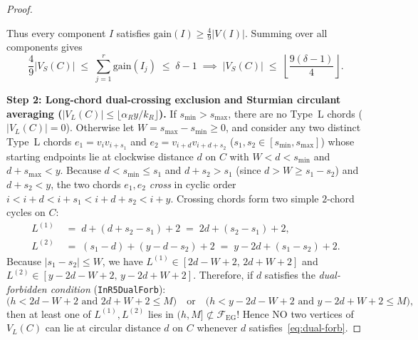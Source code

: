 \documentclass[11pt,reqno]{amsart}
\theoremstyle{plain}
\theoremstyle{definition}
\theoremstyle{remark}
\newcommand{\FEG}{\mathcal{F}_{\mathrm{EG}}}
\DeclareRobustCommand{\_}{\ifmmode\text{\textunderscore}\else\textunderscore\allowbreak\fi}
\begin{document}
\begin{proof}
\begin{itemize}[leftmargin=1.6em]
\end{itemize}
Thus every component $I$ satisfies $\mathrm{gain}(I) \ge \frac{4}{9}|V(I)|$. Summing over all components gives
\[
  \frac{4}{9}|V_S(C)| \;\le\; \sum_{j=1}^r \mathrm{gain}(I_j) \;\le\; \delta - 1 \;\implies\; |V_S(C)| \;\le\; \left\lfloor \frac{9(\delta - 1)}{4} \right\rfloor.
\]

\medskip
\noindent\textbf{Step 2: Long-chord dual-crossing exclusion and Sturmian circulant averaging ($|V_L(C)| \le \lfloor \alpha_R y / k_R \rfloor$).}
If $s_{\min} > s_{\max}$, there are no Type~L chords ($|V_L(C)| = 0$). Otherwise let $W = s_{\max} - s_{\min} \ge 0$, and consider any two distinct Type~L chords $e_1 = v_i v_{i + s_1}$ and $e_2 = v_{i + d} v_{i + d + s_2}$ ($s_1, s_2 \in [s_{\min}, s_{\max}]$) whose starting endpoints lie at clockwise distance $d$ on $C$ with $W < d < s_{\min}$ and $d + s_{\max} < y$. Because $d < s_{\min} \le s_1$ and $d + s_2 > s_1$ (since $d > W \ge s_1 - s_2$) and $d + s_2 < y$, the two chords $e_1, e_2$ \emph{cross} in cyclic order $i < i + d < i + s_1 < i + d + s_2 < i + y$. Crossing chords form two simple $2$-chord cycles on $C$:
\begin{align*}
  L^{(1)} &\;=\; d + (d + s_2 - s_1) + 2 \;=\; 2d + (s_2 - s_1) + 2,\\
  L^{(2)} &\;=\; (s_1 - d) + (y - d - s_2) + 2 \;=\; y - 2d + (s_1 - s_2) + 2.
\end{align*}
Because $|s_1 - s_2| \le W$, we have $L^{(1)} \in [2d - W + 2,\, 2d + W + 2]$ and $L^{(2)} \in [y - 2d - W + 2,\, y - 2d + W + 2]$. Therefore, if $d$ satisfies the \emph{dual-forbidden condition} (\texttt{InR5DualForb}):
\begin{equation}\label{eq:dual-forb}
  \bigl(h < 2d - W + 2 \text{ and } 2d + W + 2 \le M\bigr) \quad\text{or}\quad
  \bigl(h < y - 2d - W + 2 \text{ and } y - 2d + W + 2 \le M\bigr),
\end{equation}
then at least one of $L^{(1)}, L^{(2)}$ lies in $(h, M] \not\subset \FEG$! Hence NO two vertices of $V_L(C)$ can lie at circular distance $d$ on $C$ whenever $d$ satisfies~\eqref{eq:dual-forb}.


\end{proof}
\end{document}
